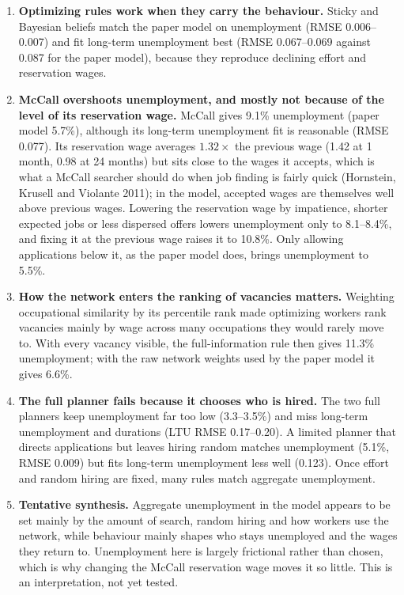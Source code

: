 \documentclass[10pt]{article}
\begin{document}
\begin{enumerate}[leftmargin=*]
  \item \textbf{Optimizing rules work when they carry the behaviour.} Sticky and Bayesian beliefs match the
  paper model on unemployment (RMSE 0.006--0.007) and fit long-term unemployment best (RMSE 0.067--0.069 against
  0.087 for the paper model), because they reproduce declining effort and reservation wages.
  \item \textbf{McCall overshoots unemployment, and mostly not because of the level of its reservation wage.}
  McCall gives 9.1\% unemployment (paper model 5.7\%), although its long-term unemployment fit is reasonable
  (RMSE 0.077). Its reservation wage averages $1.32\times$ the previous wage (1.42 at 1 month, 0.98 at 24
  months) but sits close to the wages it accepts, which is what a McCall searcher should do when job finding is
  fairly quick (Hornstein, Krusell and Violante 2011); in the model, accepted wages are themselves well above
  previous wages. Lowering the reservation wage by impatience, shorter expected jobs or less dispersed offers
  lowers unemployment only to 8.1--8.4\%, and fixing it at the previous wage raises it to 10.8\%. Only allowing
  applications below it, as the paper model does, brings unemployment to 5.5\%.
  \item \textbf{How the network enters the ranking of vacancies matters.} Weighting occupational similarity by
  its percentile rank made optimizing workers rank vacancies mainly by wage across many occupations they would
  rarely move to. With every vacancy visible, the full-information rule then gives 11.3\% unemployment; with
  the raw network weights used by the paper model it gives 6.6\%.
  \item \textbf{The full planner fails because it chooses who is hired.} The two full planners keep unemployment
  far too low (3.3--3.5\%) and miss long-term unemployment and durations (LTU RMSE 0.17--0.20). A limited
  planner that directs applications but leaves hiring random matches unemployment (5.1\%, RMSE 0.009) but fits
  long-term unemployment less well (0.123). Once effort and random hiring are fixed, many rules match aggregate
  unemployment.
  \item \textbf{Tentative synthesis.} Aggregate unemployment in the model appears to be set mainly by the amount
  of search, random hiring and how workers use the network, while behaviour mainly shapes who stays unemployed
  and the wages they return to. Unemployment here is largely frictional rather than chosen, which is why changing
  the McCall reservation wage moves it so little. This is an interpretation, not yet tested.
\end{enumerate}
\end{document}
